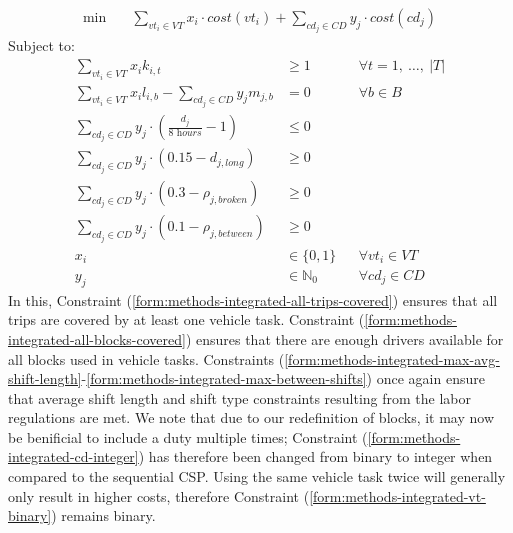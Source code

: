 \documentclass[]{article}
\begin{document}
\begin{align}
\min \quad
& \sum_{vt_i \in VT} x_{i} \cdot cost(vt_i) + \sum_{cd_j \in CD} y_{j} \cdot cost(cd_j)  
\end{align}
Subject to:
\begin{align}
\sum_{vt_i \in VT} x_{i}k_{i,t} &\geq 1 && \forall t = 1,\:\dots,\:|T| \label{form:methods-integrated-all-trips-covered} \\
\sum_{vt_i \in VT}x_i l_{i,b} - \sum_{cd_j \in CD}y_j m_{j,b} &= 0 && \forall b \in B \label{form:methods-integrated-all-blocks-covered} \\
\sum_{cd_j \in \textit{CD}} y_{j} \cdot (\frac{d_{j}}{\textit{8 hours}} - 1) &\leq 0 && \label{form:methods-integrated-max-avg-shift-length}\\
\sum_{cd_j \in \textit{CD}} y_{j} \cdot (0.15 - d_{j,\textit{long}}) &\geq 0 && \label{form:methods-integrated-max-long-shifts}\\
\sum_{cd_j \in \textit{CD}} y_{j} \cdot (0.3 - \rho_{j,\textit{broken}}) &\geq 0 && \label{form:methods-integrated-max-broken-shifts}\\
\sum_{cd_j \in \textit{CD}} y_{j} \cdot (0.1 - \rho_{j,\textit{between}}) &\geq 0 && \label{form:methods-integrated-max-between-shifts}\\
x_{i} &\in \{ 0, 1 \} && \forall vt_i \in VT \label{form:methods-integrated-vt-binary} \\
y_{j} &\in \mathbb{N}_0 && \forall cd_j \in CD \label{form:methods-integrated-cd-integer}
\end{align}
In this, Constraint (\ref{form:methods-integrated-all-trips-covered}) ensures that all trips are covered by at least one vehicle task. Constraint (\ref{form:methods-integrated-all-blocks-covered}) ensures that there are enough drivers available for all blocks used in vehicle tasks. Constraints (\ref{form:methods-integrated-max-avg-shift-length}-\ref{form:methods-integrated-max-between-shifts}) once again ensure that average shift length and shift type constraints resulting from the labor regulations are met. We note that due to our redefinition of blocks, it may now be benificial to include a duty multiple times; Constraint (\ref{form:methods-integrated-cd-integer}) has therefore been changed from binary to integer when compared to the sequential CSP. Using the same vehicle task twice will generally only result in higher costs, therefore Constraint (\ref{form:methods-integrated-vt-binary}) remains binary. 
\end{document}
